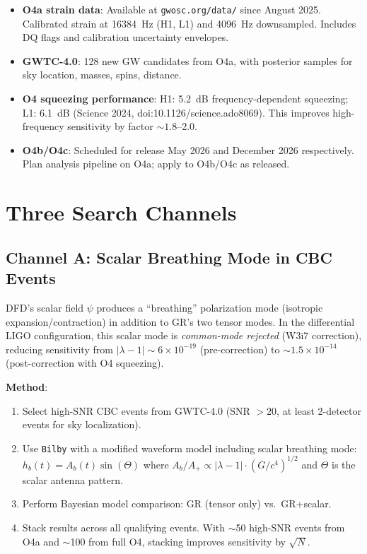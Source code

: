 \documentclass[11pt]{article}
\newcommand{\ee}[1]{\times 10^{#1}}
\newcommand{\lbone}{|\lambda - 1|}
\begin{document}
\begin{itemize}[nosep]
\item \textbf{O4a strain data}: Available at \texttt{gwosc.org/data/}
  since August 2025. Calibrated strain at 16384~Hz (H1, L1) and 4096~Hz
  downsampled. Includes DQ flags and calibration uncertainty envelopes.
\item \textbf{GWTC-4.0}: 128 new GW candidates from O4a, with posterior
  samples for sky location, masses, spins, distance.
\item \textbf{O4 squeezing performance}: H1: 5.2~dB frequency-dependent
  squeezing; L1: 6.1~dB (Science 2024, doi:10.1126/science.ado8069).
  This improves high-frequency sensitivity by factor $\sim 1.8$--2.0.
\item \textbf{O4b/O4c}: Scheduled for release May 2026 and December 2026
  respectively. Plan analysis pipeline on O4a; apply to O4b/O4c as released.
\end{itemize}

\section{Three Search Channels}

\subsection{Channel A: Scalar Breathing Mode in CBC Events}

DFD's scalar field $\psi$ produces a ``breathing'' polarization mode
(isotropic expansion/contraction) in addition to GR's two tensor modes.
In the differential LIGO configuration, this scalar mode is
\emph{common-mode rejected} (W3i7 correction), reducing sensitivity from
$\lbone \sim 6\ee{-19}$ (pre-correction) to $\sim 1.5\ee{-14}$
(post-correction with O4 squeezing).

\textbf{Method}:
\begin{enumerate}[nosep]
\item Select high-SNR CBC events from GWTC-4.0 (SNR $> 20$, at least
  2-detector events for sky localization).
\item Use \texttt{Bilby} with a modified waveform model including
  scalar breathing mode: $h_b(t) = A_b(t) \sin(\Theta)$ where
  $A_b/A_+ \propto |\lambda-1| \cdot (G/c^4)^{1/2}$ and $\Theta$ is
  the scalar antenna pattern.
\item Perform Bayesian model comparison: GR (tensor only) vs.\ GR+scalar.
\item Stack results across all qualifying events. With $\sim$50 high-SNR
  events from O4a and $\sim$100 from full O4, stacking improves sensitivity
  by $\sqrt{N}$.
\end{enumerate}
\end{document}
